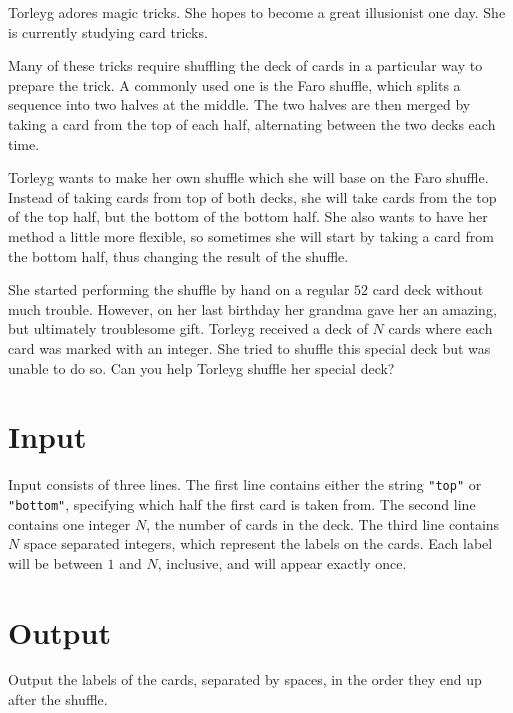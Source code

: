 
Torleyg adores magic tricks.
She hopes to become a great illusionist one day.
She is currently studying card tricks.

Many of these tricks require shuffling the deck of cards in a particular way to prepare the trick.
A commonly used one is the Faro shuffle, which splits a sequence into two halves at the middle.
The two halves are then merged by taking a card from the top of each half, alternating between the two decks each time.

Torleyg wants to make her own shuffle which she will base on the Faro shuffle.
Instead of taking cards from top of both decks, she will take cards from the top of the top half, but the bottom of the bottom half.
She also wants to have her method a little more flexible, so sometimes she will start by taking a card from the bottom half, thus changing the result of the shuffle.

She started performing the shuffle by hand on a regular $52$ card deck without much trouble.
However, on her last birthday her grandma gave her an amazing, but ultimately troublesome gift.
Torleyg received a deck of $N$ cards where each card was marked with an integer.
She tried to shuffle this special deck but was unable to do so.
Can you help Torleyg shuffle her special deck?

\section*{Input}
Input consists of three lines.
The first line contains either the string \texttt{"top"} or \texttt{"bottom"}, specifying which half the first card is taken from.
The second line contains one integer $N$, the number of cards in the deck.
The third line contains $N$ space separated integers, which represent the labels on the cards.
Each label will be between $1$ and $N$, inclusive, and will appear exactly once.

\section*{Output}
Output the labels of the cards, separated by spaces, in the order they end up after the shuffle.

